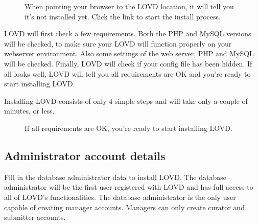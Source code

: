 \documentclass[a4paper,oneside,openany,12pt]{memoir}
\begin{document}
\begin{figure}[h]
  \begin{shaded}
  \caption{%
    When pointing your browser to the LOVD location, it will tell you it's not installed yet.
    Click the link to start the install process.}
  \end{shaded}
\end{figure}

LOVD will first check a few requirements.
Both the PHP and MySQL versions will be checked, to make sure your LOVD will function properly on your webserver environment.
Also some settings of the web server, PHP and MySQL will be checked.
Finally, LOVD will check if your config file has been hidden.
If all looks well, LOVD will tell you all requirements are OK and you're ready to start installing LOVD.
\\
\par
Installing LOVD consists of only 4 simple steps and will take only a couple of minutes, or less.

\begin{figure}[h]
  \begin{shaded}
  \caption{If all requirements are OK, you're ready to start installing LOVD.}
  \end{shaded}
\end{figure}



\subsection{Administrator account details}
Fill in the database administrator data to install LOVD.
The database administrator will be the first user registered with LOVD and has full access to all of LOVD's functionalities.
The database administrator is the only user capable of creating manager accounts.
Managers can only create curator and submitter accounts.
\end{document}
